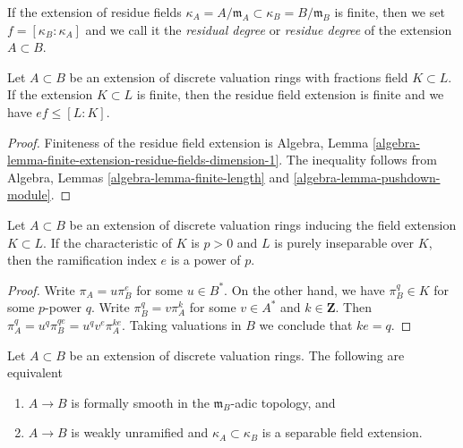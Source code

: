 \medskip\noindent
If the extension of residue fields
$\kappa_A = A/\mathfrak m_A \subset \kappa_B = B/\mathfrak m_B$
is finite, then we set $f = [\kappa_B : \kappa_A]$ and we
call it the {\it residual degree} or {\it residue degree}
of the extension $A \subset B$.

\begin{lemma}
\label{lemma-inequality}
Let $A \subset B$ be an extension of discrete valuation rings with
fractions field $K \subset L$. If the extension $K \subset L$
is finite, then the residue field extension is finite and we have
$ef \leq [L : K]$.
\end{lemma}

\begin{proof}
Finiteness of the residue field extension is
Algebra, Lemma \ref{algebra-lemma-finite-extension-residue-fields-dimension-1}.
The inequality follows from
Algebra, Lemmas \ref{algebra-lemma-finite-length} and
\ref{algebra-lemma-pushdown-module}.
\end{proof}

\begin{lemma}
\label{lemma-ramification-index-a-power-of-p}
Let $A \subset B$ be an extension of discrete valuation rings
inducing the field extension $K \subset L$. If the characteristic
of $K$ is $p > 0$ and $L$ is purely inseparable over $K$, then
the ramification index $e$ is a power of $p$.
\end{lemma}

\begin{proof}
Write $\pi_A = u \pi_B^e$ for some $u \in B^*$. On the other hand, we have
$\pi_B^q \in K$ for some $p$-power $q$. Write
$\pi_B^q = v \pi_A^k$ for some $v \in A^*$ and $k \in \mathbf{Z}$.
Then $\pi_A^q = u^q \pi_B^{qe} = u^q v^e \pi_A^{ke}$.
Taking valuations in $B$ we conclude that $ke = q$.
\end{proof}

\begin{lemma}
\label{lemma-extension-dvrs-formally-smooth}
Let $A \subset B$ be an extension of discrete valuation rings.
The following are equivalent
\begin{enumerate}
\item $A \to B$ is formally smooth in the $\mathfrak m_B$-adic topology, and
\item $A \to B$ is weakly unramified and $\kappa_A \subset \kappa_B$
is a separable field extension.
\end{enumerate}
\end{lemma}

